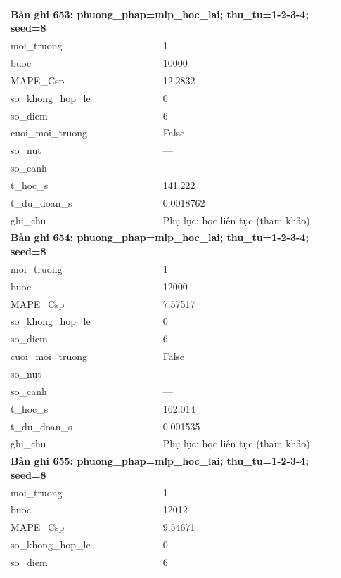 \begin{longtable}{p{0.43\linewidth}p{0.50\linewidth}}
\midrule
\multicolumn{2}{p{0.95\linewidth}}{\textbf{Bản ghi 653: phuong\_phap=mlp\_hoc\_lai; thu\_tu=1-2-3-4; seed=8}} \\
moi\_\allowbreak truong & 1 \\
buoc & 10000 \\
MAPE\_\allowbreak Csp & 12.2832 \\
so\_\allowbreak khong\_\allowbreak hop\_\allowbreak le & 0 \\
so\_\allowbreak diem & 6 \\
cuoi\_\allowbreak moi\_\allowbreak truong & False \\
so\_\allowbreak nut & — \\
so\_\allowbreak canh & — \\
t\_\allowbreak hoc\_\allowbreak s & 141.222 \\
t\_\allowbreak du\_\allowbreak doan\_\allowbreak s & 0.0018762 \\
ghi\_\allowbreak chu & Phụ lục: học liên tục (tham khảo) \\
\midrule
\multicolumn{2}{p{0.95\linewidth}}{\textbf{Bản ghi 654: phuong\_phap=mlp\_hoc\_lai; thu\_tu=1-2-3-4; seed=8}} \\
moi\_\allowbreak truong & 1 \\
buoc & 12000 \\
MAPE\_\allowbreak Csp & 7.57517 \\
so\_\allowbreak khong\_\allowbreak hop\_\allowbreak le & 0 \\
so\_\allowbreak diem & 6 \\
cuoi\_\allowbreak moi\_\allowbreak truong & False \\
so\_\allowbreak nut & — \\
so\_\allowbreak canh & — \\
t\_\allowbreak hoc\_\allowbreak s & 162.014 \\
t\_\allowbreak du\_\allowbreak doan\_\allowbreak s & 0.001535 \\
ghi\_\allowbreak chu & Phụ lục: học liên tục (tham khảo) \\
\midrule
\multicolumn{2}{p{0.95\linewidth}}{\textbf{Bản ghi 655: phuong\_phap=mlp\_hoc\_lai; thu\_tu=1-2-3-4; seed=8}} \\
moi\_\allowbreak truong & 1 \\
buoc & 12012 \\
MAPE\_\allowbreak Csp & 9.54671 \\
so\_\allowbreak khong\_\allowbreak hop\_\allowbreak le & 0 \\
so\_\allowbreak diem & 6 \\

\end{longtable}
